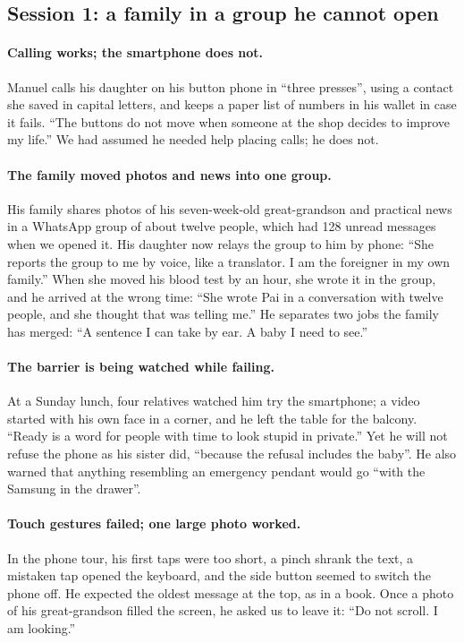 \documentclass[acmtog,nonacm]{acmart}
\begin{document}
\subsection{Session 1: a family in a group he cannot open}

\paragraph{Calling works; the smartphone does not.} Manuel calls his daughter on his button phone in ``three presses'', using a contact she saved in capital letters, and keeps a paper list of numbers in his wallet in case it fails. ``The buttons do not move when someone at the shop decides to improve my life.'' We had assumed he needed help placing calls; he does not.

\paragraph{The family moved photos and news into one group.} His family shares photos of his seven-week-old great-grandson and practical news in a WhatsApp group of about twelve people, which had 128 unread messages when we opened it. His daughter now relays the group to him by phone: ``She reports the group to me by voice, like a translator. I am the foreigner in my own family.'' When she moved his blood test by an hour, she wrote it in the group, and he arrived at the wrong time: ``She wrote Pai in a conversation with twelve people, and she thought that was telling me.'' He separates two jobs the family has merged: ``A sentence I can take by ear. A baby I need to see.''

\paragraph{The barrier is being watched while failing.} At a Sunday lunch, four relatives watched him try the smartphone; a video started with his own face in a corner, and he left the table for the balcony. ``Ready is a word for people with time to look stupid in private.'' Yet he will not refuse the phone as his sister did, ``because the refusal includes the baby''. He also warned that anything resembling an emergency pendant would go ``with the Samsung in the drawer''.

\paragraph{Touch gestures failed; one large photo worked.} In the phone tour, his first taps were too short, a pinch shrank the text, a mistaken tap opened the keyboard, and the side button seemed to switch the phone off. He expected the oldest message at the top, as in a book. Once a photo of his great-grandson filled the screen, he asked us to leave it: ``Do not scroll. I am looking.''
\end{document}

